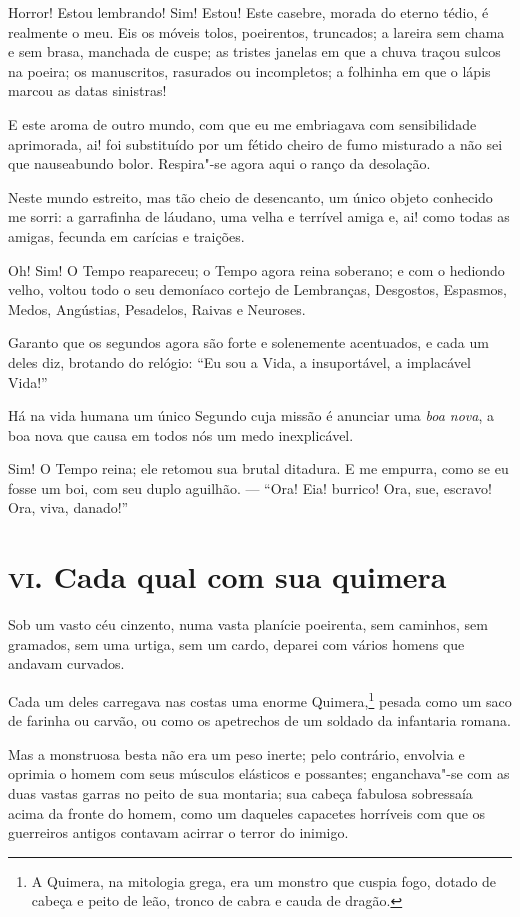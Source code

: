 Horror! Estou lembrando! Sim! Estou! Este casebre, morada do eterno
tédio, é realmente o meu. Eis os móveis
tolos, poeirentos, truncados; a
lareira sem chama e sem brasa, manchada de cuspe; as tristes janelas em
que a chuva traçou sulcos na poeira; os manuscritos, rasurados ou
incompletos; a folhinha em que o lápis marcou as datas sinistras!

E este aroma de outro mundo, com que eu me embriagava com
sensibilidade aprimorada, ai! foi substituído por um fétido cheiro
de fumo misturado a não sei que nauseabundo bolor. Respira"-se agora
aqui o ranço da desolação.

Neste mundo estreito, mas tão cheio de desencanto, um único objeto conhecido
me sorri: a garrafinha de láudano, uma velha e terrível amiga e, ai!
como todas as amigas, fecunda em carícias e traições.

Oh! Sim! O Tempo reapareceu; o Tempo agora reina soberano; e com o
hediondo velho, voltou todo o seu demoníaco cortejo de Lembranças,
Desgostos, Espasmos, Medos, Angústias, Pesadelos, Raivas e Neuroses.

Garanto que os segundos agora são forte e solenemente acentuados, e
cada um deles diz, brotando do relógio: ``Eu sou a Vida, a
insuportável, a implacável Vida!''

Há na vida humana um único Segundo cuja missão é anunciar uma \textit{boa
nova}, a boa nova que causa em todos nós um medo inexplicável.

Sim! O Tempo reina; ele retomou sua brutal ditadura. E me empurra, como
se eu fosse um boi, com seu duplo aguilhão. --- ``Ora!
Eia! burrico! Ora, sue, escravo! Ora, viva, danado!''

\chapter{\textsc{vi.} Cada qual com sua quimera}

Sob um vasto céu cinzento, numa vasta planície poeirenta, sem
caminhos, sem gramados, sem uma urtiga, sem um cardo, deparei com vários
homens que andavam curvados.

Cada um deles carregava nas costas uma enorme
Quimera,\footnote{  A Quimera, na mitologia grega, era um monstro que cuspia fogo, dotado
de cabeça e peito de leão, tronco de cabra e cauda de dragão.} pesada como um saco de farinha ou
carvão, ou como os apetrechos de um soldado da infantaria romana.

Mas a monstruosa besta não era um peso inerte; pelo contrário, envolvia
e oprimia o homem com seus músculos elásticos e possantes;
enganchava"-se com as duas vastas garras no peito de sua montaria;
sua cabeça fabulosa sobressaía acima da fronte do homem, como um
daqueles capacetes horríveis com que os guerreiros antigos
contavam acirrar o terror do inimigo.

